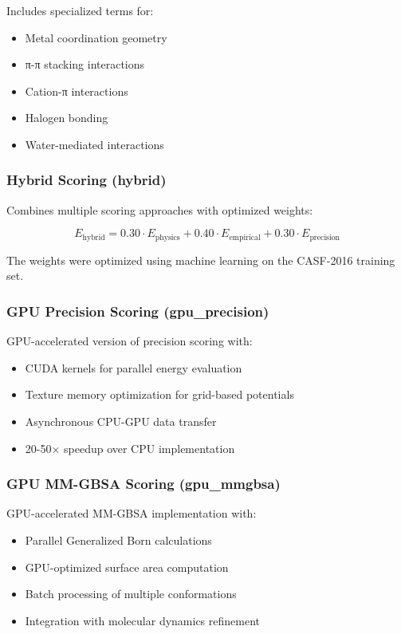 \documentclass[11pt,a4paper]{article}
\begin{document}
Includes specialized terms for:
\begin{itemize}
\item Metal coordination geometry
\item π-π stacking interactions
\item Cation-π interactions
\item Halogen bonding
\item Water-mediated interactions
\end{itemize}

\subsubsection{Hybrid Scoring (hybrid)}

Combines multiple scoring approaches with optimized weights:

\begin{equation}
E_{\text{hybrid}} = 0.30 \cdot E_{\text{physics}} + 0.40 \cdot E_{\text{empirical}} + 0.30 \cdot E_{\text{precision}}
\end{equation}

The weights were optimized using machine learning on the CASF-2016 training set.

\subsubsection{GPU Precision Scoring (gpu\_precision)}

GPU-accelerated version of precision scoring with:
\begin{itemize}
\item CUDA kernels for parallel energy evaluation
\item Texture memory optimization for grid-based potentials
\item Asynchronous CPU-GPU data transfer
\item 20-50× speedup over CPU implementation
\end{itemize}

\subsubsection{GPU MM-GBSA Scoring (gpu\_mmgbsa)}

GPU-accelerated MM-GBSA implementation with:
\begin{itemize}
\item Parallel Generalized Born calculations
\item GPU-optimized surface area computation
\item Batch processing of multiple conformations
\item Integration with molecular dynamics refinement
\end{itemize}
\end{document}
